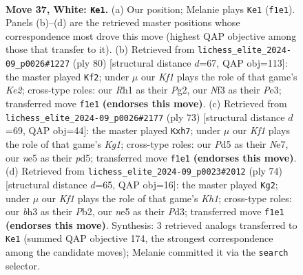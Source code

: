 \documentclass[11pt]{article}
\begin{document}
\clearpage

\begin{figure}[p]\centering
\begin{subfigure}{0.46\textwidth}\centering
\resizebox{\linewidth}{!}{%
\newchessgame
\chessboard[
  setfen={7k/R4p1p/5rp1/3Pn3/1p2P3/5NPb/1r5P/5K1R w - - 4 37},
  showmover=false,
  pgfstyle=straightmove, color=movearrow, markmove={f1-e1}
]}
\caption{}
\end{subfigure}\hfill
\begin{subfigure}{0.46\textwidth}\centering
\resizebox{\linewidth}{!}{%
\newchessgame
\chessboard[
  setfen={R5R1/2p1r2p/p5pk/1b3p2/5n1P/4PP2/4K1P1/8 w - - 7 41},
  showmover=false,
  pgfstyle=straightmove, color=movearrow, markmove={e2-f2}
]}
\caption{}
\end{subfigure}
\\[4pt]
\begin{subfigure}{0.46\textwidth}\centering
\resizebox{\linewidth}{!}{%
\newchessgame
\chessboard[
  setfen={2r3k1/4np1B/7p/3P2p1/2pP4/2R2PP1/1r1RK2P/8 b - - 2 37},
  showmover=false,
  pgfstyle=straightmove, color=movearrow, markmove={g8-h7}
]}
\caption{}
\end{subfigure}\hfill
\begin{subfigure}{0.46\textwidth}\centering
\resizebox{\linewidth}{!}{%
\newchessgame
\chessboard[
  setfen={3r2k1/1r3pp1/7p/1N4n1/P3p3/2PPR1P1/1P3P2/3R3K w - - 0 38},
  showmover=false,
  pgfstyle=straightmove, color=movearrow, markmove={h1-g2}
]}
\caption{}
\end{subfigure}
\caption{\textbf{Move 37, White: \texttt{Ke1}.} (a) Our position; Melanie plays \texttt{Ke1} (\texttt{f1e1}). Panels (b)--(d) are the retrieved master positions whose correspondence most drove this move (highest QAP objective among those that transfer to it). (b) Retrieved from \texttt{lichess\_elite\_2024-09\_p0026\#1227} (ply 80) [structural distance $d$=67, QAP obj=113]: the master played \texttt{Kf2}; under $\mu$ our \emph{Kf1} plays the role of that game's \emph{Ke2}; cross-type roles: our \emph{R}h1 as their \emph{P}g2, our \emph{N}f3 as their \emph{P}e3; transferred move \texttt{f1e1} \textbf{(endorses this move)}. (c) Retrieved from \texttt{lichess\_elite\_2024-09\_p0026\#2177} (ply 73) [structural distance $d$=69, QAP obj=44]: the master played \texttt{Kxh7}; under $\mu$ our \emph{Kf1} plays the role of that game's \emph{Kg1}; cross-type roles: our \emph{P}d5 as their \emph{N}e7, our \emph{n}e5 as their \emph{p}d5; transferred move \texttt{f1e1} \textbf{(endorses this move)}. (d) Retrieved from \texttt{lichess\_elite\_2024-09\_p0023\#2012} (ply 74) [structural distance $d$=65, QAP obj=16]: the master played \texttt{Kg2}; under $\mu$ our \emph{Kf1} plays the role of that game's \emph{Kh1}; cross-type roles: our \emph{b}h3 as their \emph{P}b2, our \emph{n}e5 as their \emph{P}d3; transferred move \texttt{f1e1} \textbf{(endorses this move)}. Synthesis: 3 retrieved analogs transferred to \texttt{Ke1} (summed QAP objective 174, the strongest correspondence among the candidate moves); Melanie committed it via the \texttt{search} selector.}
\label{fig:thought-m72}
\end{figure}
\end{document}
